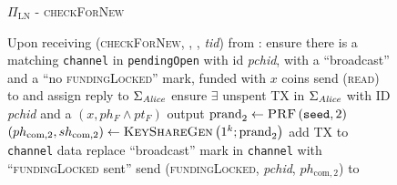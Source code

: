   \begin{figure}[H]
    \begin{protocolbox}{$\Pi_{\mathrm{LN}}$ - \textsc{checkForNew}}
      \begin{algorithmic}[1]
        \State Upon receiving (\textsc{checkForNew}, \alice, \bob, \textit{tid})
        from \environment: 
        \Indent
          \State ensure there is a matching \texttt{channel} in
          \texttt{pendingOpen} with id \textit{pchid}, with a ``broadcast''
          and a ``no \textsc{fundingLocked}'' mark, funded with $x$ coins
          \label{alg:protocol:checkForNew:valid}
          \State send (\textsc{read}) to \ledger{} and assign reply to
          $\Sigma_{\mathit{Alice}}$
          \label{alg:protocol:checkForNew:read}
          \State ensure $\exists$ unspent TX in $\Sigma_{\mathit{Alice}}$ with ID
          \textit{pchid} and a $\left(x, ph_F \wedge pt_F\right)$ output
          \label{alg:protocol:checkForNew:included}
          \State $\mathrm{prand}_2 \gets \textsc{PRF}\left(\mathtt{seed},
          2\right)$
          \label{alg:protocol:checkForNew:prand}
          \State $\left(ph_{\mathrm{com}, 2}, sh_{\mathrm{com}, 2}\right) \gets
          \textsc{KeyShareGen}\left(1^k; \mathrm{prand}_2\right)$
          \State add TX to \texttt{channel} data
          \State replace ``broadcast'' mark in \texttt{channel} with
          ``\textsc{fundingLocked} sent''
          \State send (\textsc{fundingLocked}, \textit{pchid},
          $ph_{\mathrm{com}, 2}$) to \bob{}
          \label{alg:protocol:checkForNew:send}
        \EndIndent
      \end{algorithmic}
    \end{protocolbox}
    \caption{}
    \label{alg:protocol:checkForNew}
  \end{figure}

